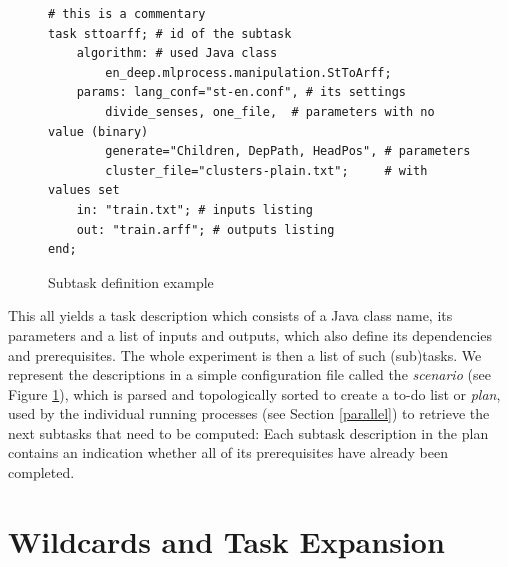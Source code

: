 \documentclass[12pt,notitlepage]{report}
\begin{document}
\begin{figure}
\caption{Subtask definition example}\label{fig:scenario}
\begin{center}
\begin{lstlisting}
# this is a commentary
task sttoarff; # id of the subtask
    algorithm: # used Java class
        en_deep.mlprocess.manipulation.StToArff; 
    params: lang_conf="st-en.conf", # its settings
        divide_senses, one_file,  # parameters with no value (binary)
        generate="Children, DepPath, HeadPos", # parameters
        cluster_file="clusters-plain.txt";     # with values set
    in: "train.txt"; # inputs listing
    out: "train.arff"; # outputs listing
end;
\end{lstlisting}
\end{center}
\end{figure}

This all yields a task description which consists of a Java class name, its parameters and a list of inputs and outputs, which also define its dependencies and prerequisites. The whole experiment is then a list of such (sub)tasks. We represent the descriptions in a simple configuration file called the \emph{scenario} (see Figure \ref{fig:scenario}), which is parsed and topologically sorted \citep{kahn62} to create a to-do list or \emph{plan}, used by the individual running processes (see Section \ref{parallel}) to retrieve the next subtasks that need to be computed: Each subtask description in the plan contains an indication whether all of its prerequisites have already been completed.

\section{Wildcards and Task Expansion}\label{expansions}
\end{document}
